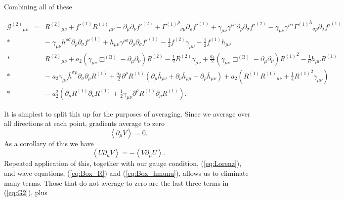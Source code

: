 \documentclass[aps,prd,amsfonts,amssymb,amsmath,nofootinbib,reprint,showpacs]{revtex4-1}
\newcommand{\eqnref}[1]{(\ref{eq:#1})}
\newcommand{\recip}[1]{\ensuremath{\frac{1}{#1}}}
\begin{document}
Combining all of these
\begin{widetext}
\begin{eqnarray}
{\mathcal{G}^{(2)}}_{\mu\nu} & = & {R^{(2)}}_{\mu\nu} + f'^{(1)}{R^{(1)}}_{\mu\nu} - \partial_\mu\partial_\nu f'^{(2)} + {{\Gamma^{(1)}}^\rho}_{\nu\mu}\partial_\rho f'^{(1)} + \gamma_{\mu\nu}\gamma^{\rho\sigma}\partial_\rho\partial_\sigma f'^{(2)} - \gamma_{\mu\nu}\gamma^{\rho\sigma}{{\Gamma^{(1)}}^\lambda}_{\sigma\rho}\partial_\lambda f'^{(1)} \nonumber \\*
 & & - {\;} \gamma_{\mu\nu}h^{\rho\sigma}\partial_\rho\partial_\sigma f'^{(1)} + h_{\mu\nu}\gamma^{\rho\sigma}\partial_\rho\partial_\sigma f'^{(1)} - \recip{2}f^{(2)}\gamma_{\mu\nu} - \recip{2}f^{(1)}h_{\mu\nu} \nonumber \\*
 & = & {R^{(2)}}_{\mu\nu} + a_2\left(\gamma_{\mu\nu}\Box^{(\text{B})} - \partial_\mu\partial_\nu\right)R^{(2)} - \recip{2}R^{(2)}\gamma_{\mu\nu} + \frac{a_3}{2}\left(\gamma_{\mu\nu}\Box^{(\text{B})} - \partial_\mu\partial_\nu\right){R^{(1)}}^2 - \recip{6}\overline{h}_{\mu\nu}R^{(1)} \nonumber \\*
 & & - {\;} a_2\gamma_{\mu\nu}\overline{h}^{\sigma\rho}\partial_\sigma\partial_\rho R^{(1)} + \frac{a_2}{2} \partial^\rho R^{(1)} \left(\partial_\mu\overline{h}_{\rho\nu} + \partial_\nu\overline{h}_{\rho\mu} - \partial_\rho\overline{h}_{\mu\nu}\right) + a_2\left(R^{(1)}{R^{(1)}}_{\mu\nu} + \recip{4}{R^{(1)}}^2\gamma_{\mu\nu}\right) \nonumber \\*
 & & - {\;} a_2^2\left(\partial_\mu R^{(1)}\partial_\nu R^{(1)} + \recip{2} \gamma_{\mu\nu}\partial^\rho R^{(1)}\partial_\rho R^{(1)}\right).
 \label{eq:G2}
\end{eqnarray}
\end{widetext}
It is simplest to split this up for the purposes of averaging. Since we average over all directions at each point, gradients average to zero~\cite{Hobson2006, Stein2011}
\begin{equation}
\left\langle\partial_\mu V\right\rangle = 0.
\end{equation}
As a corollary of this we have
\begin{equation}
\left\langle U\partial_\mu V\right\rangle = -\left\langle V \partial_\mu U\right\rangle.
\end{equation}
Repeated application of this, together with our gauge condition, \eqnref{Lorenz}, and wave equations, \eqnref{Box_R} and \eqnref{Box_hmunu}, allows us to eliminate many terms. Those that do not average to zero are the last three terms in \eqnref{G2}, plus
\end{document}
